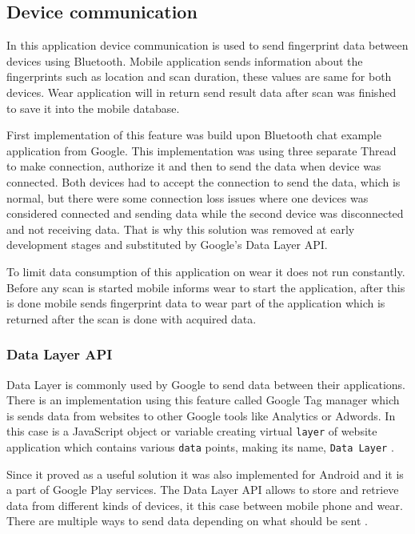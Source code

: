 \subsection{Device communication}\label{subsec:DeviceCommunication}
In this application device communication is used to send fingerprint data between devices using Bluetooth. Mobile application sends information about the fingerprints such as location and scan duration, these values are same for both devices. Wear application will in return send result data after scan was finished to save it into the mobile database.

First implementation of this feature was build upon Bluetooth chat example application from Google. This implementation was using three separate Thread to make connection, authorize it and then to send the data when device was connected. Both devices had to accept the connection to send the data, which is normal, but there were some connection loss issues where one devices was considered connected and sending data while the second device was disconnected and not receiving data. That is why this solution was removed at early development stages and substituted by Google's Data Layer API.

To limit data consumption of this application on wear it does not run constantly. Before any scan is started mobile informs wear to start the application, after this is done mobile sends fingerprint data to wear part of the application which is returned after the scan is done with acquired data.


\subsubsection{Data Layer API}\label{subsec:DataLayerAPI}
Data Layer is commonly used by Google to send data between their applications. There is an implementation using this feature called Google Tag manager which is sends data from websites to other Google tools like Analytics or Adwords. In this case is a JavaScript object or variable creating virtual \verb|layer| of website application which contains various \verb|data| points, making its name, \verb|Data Layer| \cite{GTMDL}.

Since it proved as a useful solution it was also implemented for Android and it is a part of Google Play services. The Data Layer API allows to store and retrieve data from different kinds of devices, it this case between mobile phone and wear. There are multiple ways to send data depending on what should be sent \cite{AD}.

